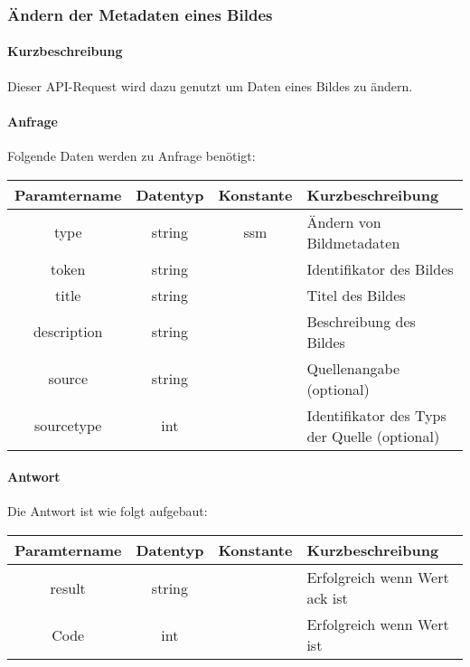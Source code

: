 \subsubsection{Ändern der Metadaten eines Bildes}
\paragraph{Kurzbeschreibung}Dieser API-Request wird dazu genutzt um Daten eines Bildes zu ändern.
\paragraph{Anfrage}Folgende Daten werden zu Anfrage benötigt:
\begin{table}[H]
	\begin{tabular}{|c|c|c|p{6.5cm}|}
		\hline
		\textbf{Paramtername} & \textbf{Datentyp} & \textbf{Konstante} & \textbf{Kurzbeschreibung}                                                                                               \\ \hline
		type                & string            & ssm                & Ändern von Bildmetadaten \\ \hline
		token               & string            &                    & Identifikator des Bildes \\ \hline
		title               & string            &                    & Titel des Bildes \\ \hline
		description         & string            &                    & Beschreibung des Bildes \\ \hline
		source              & string            &                    & Quellenangabe (optional) \\ \hline
		sourcetype          & int               &                    & Identifikator des Typs der Quelle (optional) \\ \hline
	\end{tabular}
\end{table}
\paragraph{Antwort}Die Antwort ist wie folgt aufgebaut:
\begin{table}[H]
	\begin{tabular}{|c|c|c|p{6.5cm}|}
		\hline
		\textbf{Paramtername} & \textbf{Datentyp} & \textbf{Konstante} & \textbf{Kurzbeschreibung}                                                                                               \\ \hline
		result              & string           &                 & Erfolgreich wenn Wert {\glqq ack\grqq} ist \\ \hline
		Code                & int              &                 & Erfolgreich wenn Wert {\glqq 0\grqq} ist \\ \hline
	\end{tabular}
\end{table}
